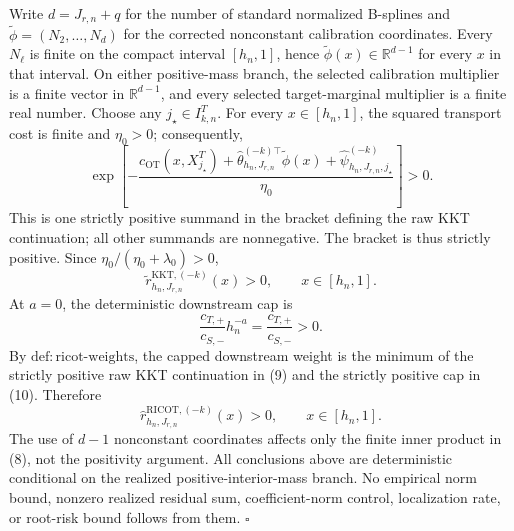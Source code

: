 Write \(d=J_{r,n}+q\) for the number of standard normalized B-splines and \(\widetilde\phi=(N_2,\ldots,N_d)\) for the corrected nonconstant calibration coordinates. Every \(N_\ell\) is finite on the compact interval \([h_n,1]\), hence \(\widetilde\phi(x)\in\mathbb R^{d-1}\) for every \(x\) in that interval. On either positive-mass branch, the selected calibration multiplier is a finite vector in \(\mathbb R^{d-1}\), and every selected target-marginal multiplier is a finite real number. Choose any \(j_\star\in I^T_{k,n}\). For every \(x\in[h_n,1]\), the squared transport cost is finite and \(\eta_0>0\); consequently,
\[
\exp\!\left[-\frac{
c_{\mathrm{OT}}(x,X_{j_\star}^T)
+\widehat\theta_{h_n,J_{r,n}}^{(-k)\top}\widetilde\phi(x)
+\widehat\psi^{(-k)}_{h_n,J_{r,n},j_\star}}
{\eta_0}\right]>0.
\tag{8}
\]
This is one strictly positive summand in the bracket defining the raw KKT continuation; all other summands are nonnegative. The bracket is thus strictly positive. Since \(\eta_0/(\eta_0+\lambda_0)>0\),
\[
\widetilde r^{\mathrm{KKT},(-k)}_{h_n,J_{r,n}}(x)>0,
\qquad x\in[h_n,1].
\tag{9}
\]
At \(a=0\), the deterministic downstream cap is
\[
\frac{c_{T,+}}{c_{S,-}}h_n^{-a}
=\frac{c_{T,+}}{c_{S,-}}>0.
\tag{10}
\]
By \(\mathrm{def:ricot\text{-}weights}\), the capped downstream weight is the minimum of the strictly positive raw KKT continuation in (9) and the strictly positive cap in (10). Therefore
\[
\widehat r^{\mathrm{RICOT},(-k)}_{h_n,J_{r,n}}(x)>0,
\qquad x\in[h_n,1].
\tag{11}
\]
The use of \(d-1\) nonconstant coordinates affects only the finite inner product in (8), not the positivity argument. All conclusions above are deterministic conditional on the realized positive-interior-mass branch. No empirical norm bound, nonzero realized residual sum, coefficient-norm control, localization rate, or root-risk bound follows from them. \(\square\)